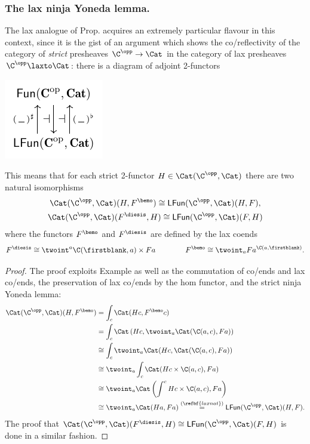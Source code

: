 \subsubsection{\bf The lax ninja Yoneda lemma.}\label{laxyonedaninja} The lax analogue of Prop\@.  acquires an extremely particular flavour in this context, since it is the gist of an argument which shows the co/reflectivity of the category of \emph{strict} presheaves $\C^\opp\to \Cat$ in the category of lax presheaves $\C^\opp\laxto \Cat$: there is a diagram of adjoint 2-functors
\begin{center}
\includegraphics[scale=1]{figures/fig8}
\end{center}
This means that for each strict 2-functor $H\in \Cat(\C^\opp, \Cat)$ there are two natural isomorphisms
\begin{gather}
\Cat(\C^\opp, \Cat)(H, F^\bemo) \cong \textsf{LFun}(\C^\opp, \Cat)(H,F),\notag \\
\Cat(\C^\opp, \Cat)(F^\diesis, H)\cong \textsf{LFun}(\C^\opp, \Cat)(F,H)
\end{gather}
where the functors $F^\bemo$ and $F^\diesis$ are defined by the lax coends
\[
F^\diesis \cong \twoint^a \C(\firstblank,a)\times Fa \qquad\qquad
F^\bemo \cong \twoint_a Fa^{\C(a,\firstblank)}.
\]
\begin{proof}
The proof exploits Example  as well as the commutation of co/ends and lax co/ends, the preservation of lax co/ends by the hom functor, and the strict ninja Yoneda lemma:
 \begin{align*}
 \Cat(\C^\opp,\Cat)(H, F^\bemo) & = \int_c \Cat(Hc, F^\bemo c) \\
& = \int_c \Cat \left(Hc, \twoint_a \Cat(\C(a,c), Fa) \right)\\
 & \cong \int_c \twoint_a \Cat(Hc, \Cat(\C(a,c), Fa)) \\
 & \cong \twoint_a \int_c \Cat(Hc\times \C(a,c), Fa) \\
 & \cong \twoint_a \Cat\left( \int^c Hc \times \C(a,c), Fa \right)\\
 & \cong \twoint_a \Cat(Ha, Fa) \overset{(\refbf{laxnat})}= \textsf{LFun}(\C^\opp, \Cat)(H,F).
 \end{align*}
The proof that $\Cat(\C^\opp, \Cat)(F^\diesis, H)\cong \textsf{LFun}(\C^\opp, \Cat)(F,H)$ is done in a similar fashion.
\end{proof}
